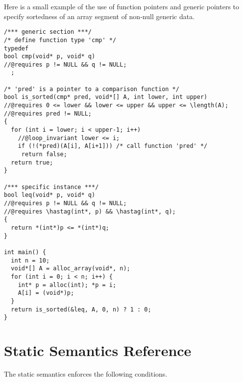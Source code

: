 \documentclass[11pt]{article}
\begin{document}
Here is a small example of the use of function pointers and generic
pointers to specify sortedness of an array segment of non-null generic
data.
\begin{lstlisting}
/*** generic section ***/
/* define function type 'cmp' */
typedef
bool cmp(void* p, void* q)
//@requires p != NULL && q != NULL;
  ;

/* 'pred' is a pointer to a comparison function */
bool is_sorted(cmp* pred, void*[] A, int lower, int upper)
//@requires 0 <= lower && lower <= upper && upper <= \length(A);
//@requires pred != NULL;
{
  for (int i = lower; i < upper-1; i++)
    //@loop_invariant lower <= i;
    if (!(*pred)(A[i], A[i+1])) /* call function 'pred' */
     return false;
  return true;
}

/*** specific instance ***/
bool leq(void* p, void* q)
//@requires p != NULL && q != NULL;
//@requires \hastag(int*, p) && \hastag(int*, q);
{
  return *(int*)p <= *(int*)q;
}

int main() {
  int n = 10;
  void*[] A = alloc_array(void*, n);
  for (int i = 0; i < n; i++) {
    int* p = alloc(int); *p = i;
    A[i] = (void*)p;
  }
  return is_sorted(&leq, A, 0, n) ? 1 : 0;
}
\end{lstlisting}

\clearpage
\section{Static Semantics Reference}

The static semantics enforces the following conditions.
\end{document}
